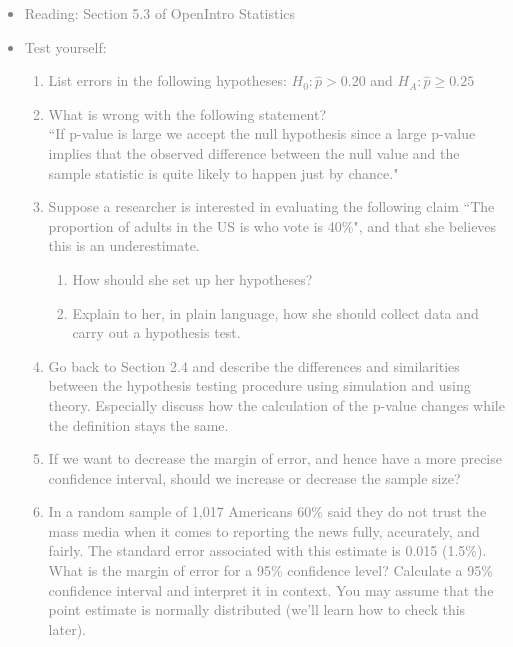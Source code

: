 \documentclass[11pt]{article}
\newcommand{\gray}[1]{\textcolor{gray}{#1}}
\begin{document}
\gray{
{\it
\vspace{-0.5cm}
\begin{itemize}
\renewcommand{\labelitemi}{{\textcolor{dark}{$\ast$}}}
\item Reading: Section 5.3 of OpenIntro Statistics
\item Test yourself: 
{\small
\begin{enumerate}
\item List errors in the following hypotheses: $H_0: \hat{p} > 0.20$ and $H_A: \hat{p} \ge 0.25$
\item What is wrong with the following statement? \\
``If p-value is large we accept the null hypothesis since a large p-value implies that the observed difference between the null value and the sample statistic is quite likely to happen just by chance."
\item Suppose a researcher is interested in evaluating the following claim ``The proportion of adults in the US is who vote is 40\%", and that she believes this is an underestimate.
\begin{enumerate}
\item How should she set up her hypotheses? 
\item Explain to her, in plain language, how she should collect data and carry out a hypothesis test.
\end{enumerate}
\item Go back to Section 2.4 and describe the differences and similarities between the hypothesis testing procedure using simulation and using theory. Especially discuss how the calculation of the p-value changes while the definition stays the same.
\item If we want to decrease the margin of error, and hence have a more precise confidence interval, should we increase or decrease the sample size?
\item In a random sample of 1,017 Americans 60\% said they do not trust the mass media when it comes to reporting the news fully, accurately, and fairly. The standard error associated with this estimate is 0.015 (1.5\%). What is the margin of error for a 95\% confidence level? Calculate a 95\% confidence interval and interpret it in context. You may assume that the point estimate is normally distributed (we'll learn how to check this later).
\end{enumerate}
}
\end{itemize}
}}
\end{document}
